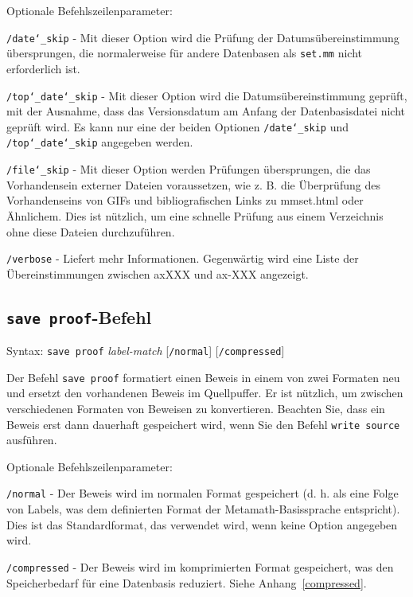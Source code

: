 Optionale Befehlszeilenparameter:

    \texttt{/date{\char`\_}skip} - Mit dieser Option wird die Prüfung der Datums\-über\-ein\-stimmung übersprungen, die normalerweise für andere Datenbasen als \texttt{set.mm} nicht erforderlich ist.

    \texttt{/top{\char`\_}date{\char`\_}skip} - Mit dieser Option wird die Datumsübereinstimmung geprüft, mit der Ausnahme, dass das Versionsdatum am Anfang der Datenbasisdatei nicht geprüft wird.  Es kann nur eine der beiden Optionen \texttt{/date{\char`\_}skip} und \texttt{/top{\char`\_}date{\char`\_}skip} angegeben werden.

    \texttt{/file{\char`\_}skip} - Mit dieser Option werden Prüfungen übersprungen, die das Vorhandensein externer Dateien voraussetzen, wie z. B. die Überprüfung des Vorhandenseins von GIFs und bibliografischen Links zu mmset.html oder Ähnlichem.  Dies ist nützlich, um eine schnelle Prüfung aus einem Verzeichnis ohne diese Dateien durchzuführen.

    \texttt{/verbose} - Liefert mehr Informationen.  Gegenwärtig wird eine Liste der Übereinstimmungen zwischen axXXX und ax-XXX angezeigt.


\subsection{\texttt{save proof}-Befehl}

Syntax:  \texttt{save proof} {\em label-match} [\texttt{/normal}]
   [\texttt{/compressed}]

   Der Befehl \texttt{save proof} formatiert einen Beweis in einem von zwei Formaten neu und ersetzt den vorhandenen Beweis im Quellpuffer.  Er ist nützlich, um zwischen verschiedenen Formaten von Beweisen zu konvertieren.  Beachten Sie, dass ein Beweis erst dann dauerhaft gespeichert wird, wenn Sie den Befehl \texttt{write source} ausführen.

Optionale Befehlszeilenparameter:

    \texttt{/normal} - Der Beweis wird im normalen Format gespeichert (d. h. als eine Folge von Labels, was dem definierten Format der Metamath-Basissprache entspricht).  Dies ist das Standardformat, das verwendet wird, wenn keine Option angegeben wird.

    \texttt{/compressed} - Der Beweis wird im komprimierten Format gespeichert, was den Speicherbedarf für eine Datenbasis reduziert. Siehe Anhang~\ref{compressed}.


